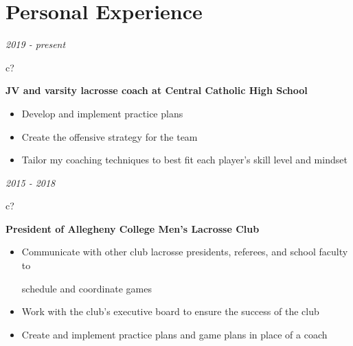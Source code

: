 \documentclass[12pt,a4paper,sans]{moderncv} %
\begin{document}

\vspace{-9 mm}
\section{Personal Experience}

 \textit{2019 - present}
\hspace{-1.7 mm}
\begin{tabular}{c?} \\
\end{tabular}
 \hspace{2 mm}
 \textbf{JV and varsity lacrosse coach at Central Catholic High School} 
 \vspace{0 mm}
 \begin{itemize}
 \addtolength{\itemindent}{31.7 mm}
 \item{Develop and implement practice plans}
 \item{Create the offensive strategy for the team}
 \item{Tailor my coaching techniques to best fit each player's skill level and mindset}
 
 \end{itemize}
 
 
\textit{2015 - 2018}
\hspace{2 mm}
\begin{tabular}{c?}
 \\
\end{tabular}
 \hspace{2 mm}
 \textbf{President of Allegheny College Men's Lacrosse Club} 
 \vspace{0 mm}
 \begin{itemize}
 \addtolength{\itemindent}{31.7 mm}
 \item{Communicate with other club lacrosse presidents, referees, and school faculty to 
 
 \hspace{32 mm}schedule and coordinate games}
 
 
 \item{Work with the club's executive board to ensure the success of the club }
 \item{Create and implement practice plans and game plans in place of a coach}
 \end{itemize}
 
\end{document}
